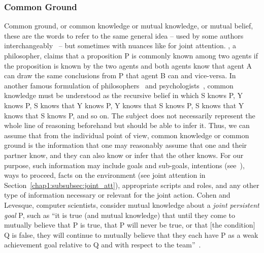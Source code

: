 \documentclass[a4paper,11pt,twoside]{StyleThese}
\begin{document}
\subsubsection{Common Ground}\label{chap1:subsubsec:common_g}
Common ground, or common knowledge or mutual knowledge, or mutual belief, these are the words to refer to the same general idea -- used by some authors interchangeably~\citep{clark_1992_arenas, clark_1996_using} -- but sometimes with nuances like for joint attention. \cite{lewis_1969_convention}, a philosopher, claims that a proposition P is commonly known among two agents if the proposition is known by the two agents and both agents know that agent A can draw the same conclusions from P that agent B can and vice-versa. In another famous formulation of philosophers~\citep{schiffer_1972_meaning} and psychologists~\citep{thomas_2014_psychology}, common knowledge must be understood as the recursive belief in which S knows P, Y knows P, S knows that Y knows P, Y knows that S knows P, S knows that Y knows that S knows P, and so on. The subject does not necessarily represent the whole line of reasoning beforehand but should be able to infer it. Thus, we can assume that from the individual point of view, common knowledge or common ground is the information that one may reasonably assume that one and their partner know, and they can also know or infer that the other knows. For our purpose, such information may include goals and sub-goals, intentions (see~\citep{bratman_1992_coop}), ways to proceed, facts on the environment (see joint attention in Section~\ref{chap1:subsubsec:joint_att}), appropriate scripts and roles, and any other type of information necessary or relevant for the joint action. Cohen and Levesque, computer scientists, consider mutual knowledge about a \emph{joint persistent goal} P, such as ``it is true (and mutual knowledge) that until they come to mutually believe that P is true, that P will never be true, or that [the condition] Q is false, they will continue to mutually believe that they each have P as a weak achievement goal relative to Q and with respect to the team''~\citep[p.~499]{cohen_1991_teamwork}.
\end{document}
